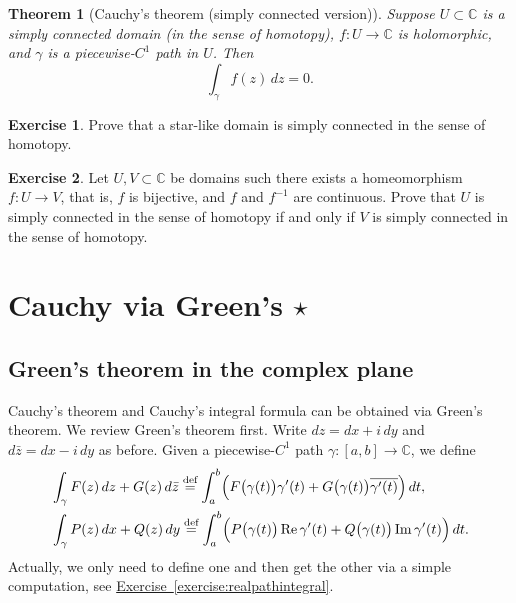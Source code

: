\documentclass[12pt,openany]{book}
\renewcommand{\Re}{\operatorname{Re}}
\renewcommand{\Im}{\operatorname{Im}}
\newcommand{\C}{{\mathbb{C}}}
\theoremstyle{plain}
\newtheorem{thm}{Theorem}[section]
\theoremstyle{remark}
\theoremstyle{definition}
\newenvironment{exbox}{%
    \def\FrameCommand{\vrule width 1pt \relax\hspace{10pt}}%
    \MakeFramed{\advance\hsize-\width\FrameRestore}%
}{%
    \endMakeFramed
}
\theoremstyle{exercise}
\newtheorem{exercise}{Exercise}[section]
\theoremstyle{example}
\newcommand{\exerciseref}[1]{\hyperref[#1]{Exercise~\ref*{#1}}}
\begin{document}
\begin{thm}[Cauchy's theorem (simply connected version)]
%
Suppose $U \subset \C$ is a simply connected domain (in the sense of
homotopy), $f \colon U \to \C$ is holomorphic,
and $\gamma$ is a piecewise-$C^1$ path in $U$.  Then
\begin{equation*}
\int_{\gamma} f(z) \, dz = 0 .
\end{equation*}
\end{thm}

\begin{exbox}
\begin{exercise}
Prove that a star-like domain is simply connected in the sense of homotopy.
\end{exercise}

\begin{exercise}
Let $U,V \subset \C$ be domains such 
there exists a homeomorphism
$f \colon U \to V$, that is, $f$ is bijective, and $f$ and $f^{-1}$ are
continuous.  Prove that $U$ is simply connected in the sense of homotopy if
and only if $V$ is simply connected in the sense of homotopy.
\end{exercise}
\end{exbox}


\section{Cauchy via Green's \texorpdfstring{$\star$}{*}}

\subsection{Green's theorem in the complex plane}

Cauchy's theorem and Cauchy's integral formula can be obtained via 
Green's theorem.
We review Green's theorem first.
Write $dz = dx + i\, dy$ and $d\bar{z} = dx - i \, dy$ as before.
Given a piecewise-$C^1$ path $\gamma \colon [a,b] \to \C$, we define
\begin{align*}
& \int_\gamma
F(z) \, dz + G(z) \, d\bar{z}
\overset{\text{def}}{=}
\int_a^b 
\Bigl(F\bigl(\gamma(t)\bigr) \gamma'(t) + G\bigl(\gamma(t)\bigr)
\overline{\gamma'(t)} \Bigr) \, dt ,
\\
& \int_\gamma
P(z) \, dx + Q(z) \, dy
\overset{\text{def}}{=}
\int_a^b 
\Bigl(P\bigl(\gamma(t)\bigr) \Re \gamma'(t) + Q\bigl(\gamma(t)\bigr) \Im
\gamma'(t) \Bigr) \, dt .
\end{align*}
Actually, we only need to define one and then get the other via a simple
computation, see \exerciseref{exercise:realpathintegral}.
\end{document}
